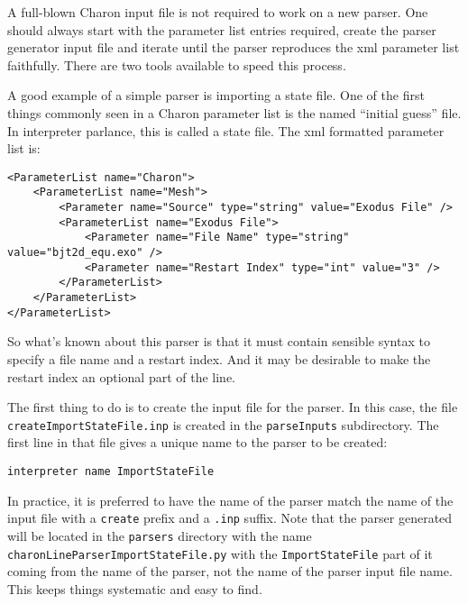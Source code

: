 A full-blown Charon input file is not required to work on a new
parser.  One should always start with the parameter list entries
required, create the parser generator input file and iterate until the
parser reproduces the xml parameter list faithfully.  There are two
tools available to speed this process.

A good example of a simple parser is importing a state file.  One of
the first things commonly seen in a Charon parameter list is the named
``initial guess'' file.  In interpreter parlance, this is called a
state file.  The xml formatted parameter list is:
\begin{lstlisting}
<ParameterList name="Charon">
    <ParameterList name="Mesh">
        <Parameter name="Source" type="string" value="Exodus File" />
        <ParameterList name="Exodus File">
            <Parameter name="File Name" type="string" value="bjt2d_equ.exo" />
            <Parameter name="Restart Index" type="int" value="3" />
        </ParameterList>
    </ParameterList>
</ParameterList>
\end{lstlisting}
So what's known about this parser is that it must contain sensible
syntax to specify a file name and a restart index.  And it may be
desirable to make the restart index an optional part of the line.

The first thing to do is to create the input file for the parser.  In
this case, the file \texttt{createImportStateFile.inp} is created in
the \texttt{parseInputs} subdirectory.  The first line in that file
gives a unique name to the parser to be created:
\begin{lstlisting}
interpreter name ImportStateFile
\end{lstlisting}
In practice, it is preferred to have the name of the parser match the
name of the input file with a \texttt{create} prefix and a
\texttt{.inp} suffix.  Note that the parser generated will be located
in the \texttt{parsers} directory with the name
\texttt{charonLineParserImportStateFile.py} with the
\texttt{ImportStateFile} part of it coming from the name of the
parser, not the name of the parser input file name.  This keeps things
systematic and easy to find.

